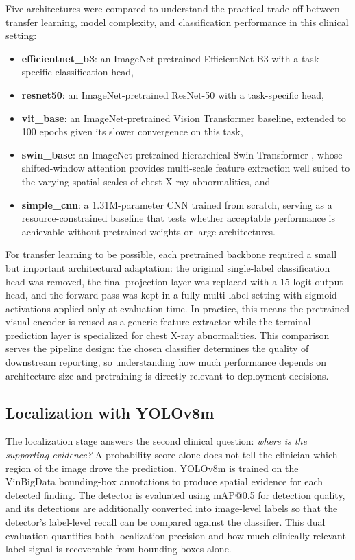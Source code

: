 \documentclass[conference]{IEEEtran}
\begin{document}
Five architectures were compared to understand the practical trade-off between transfer learning, model complexity, and classification performance in this clinical setting:
\begin{itemize}
    \item \textbf{efficientnet\_b3}: an ImageNet-pretrained EfficientNet-B3 \cite{efficientnet} with a task-specific classification head,
    \item \textbf{resnet50}: an ImageNet-pretrained ResNet-50 \cite{resnet} with a task-specific head,
    \item \textbf{vit\_base}: an ImageNet-pretrained Vision Transformer \cite{vit} baseline, extended to 100 epochs given its slower convergence on this task,
    \item \textbf{swin\_base}: an ImageNet-pretrained hierarchical Swin Transformer \cite{swin}, whose shifted-window attention provides multi-scale feature extraction well suited to the varying spatial scales of chest X-ray abnormalities, and
    \item \textbf{simple\_cnn}: a 1.31M-parameter CNN trained from scratch, serving as a resource-constrained baseline that tests whether acceptable performance is achievable without pretrained weights or large architectures.
\end{itemize}

For transfer learning to be possible, each pretrained backbone required a small but important architectural adaptation: the original single-label classification head was removed, the final projection layer was replaced with a 15-logit output head, and the forward pass was kept in a fully multi-label setting with sigmoid activations applied only at evaluation time. In practice, this means the pretrained visual encoder is reused as a generic feature extractor while the terminal prediction layer is specialized for chest X-ray abnormalities. This comparison serves the pipeline design: the chosen classifier determines the quality of downstream reporting, so understanding how much performance depends on architecture size and pretraining is directly relevant to deployment decisions.

\subsection{Localization with YOLOv8m}
The localization stage answers the second clinical question: \textit{where is the supporting evidence?} A probability score alone does not tell the clinician which region of the image drove the prediction. YOLOv8m \cite{yolo} is trained on the VinBigData bounding-box annotations to produce spatial evidence for each detected finding. The detector is evaluated using mAP@0.5 for detection quality, and its detections are additionally converted into image-level labels so that the detector's label-level recall can be compared against the classifier. This dual evaluation quantifies both localization precision and how much clinically relevant label signal is recoverable from bounding boxes alone.
\end{document}
